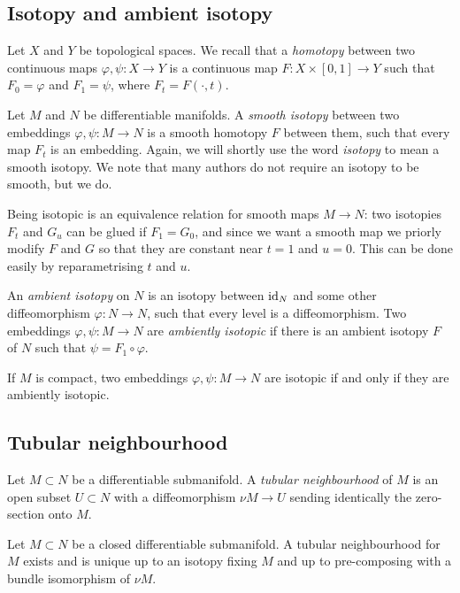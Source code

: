 \subsection{Isotopy and ambient isotopy} \label{isotopy:subsection}
Let $X$ and $Y$ be topological spaces. We recall that a \emph{homotopy} between two continuous maps $\varphi, \psi\colon X \to Y$ is a continuous map $F\colon X\times [0,1]\to Y$  such that $F_0 = \varphi$ and $F_1 = \psi$, where $F_t = F(\cdot, t)$. 

Let $M$ and $N$ be differentiable manifolds. A \emph{smooth isotopy} between two embeddings $\varphi, \psi\colon M \to N$ is a smooth homotopy $F$ between them, such that every map $F_t$ is an embedding. Again, we will shortly use the word \emph{isotopy} to mean a smooth isotopy. We note that many authors do not require an isotopy to be smooth, but we do.

Being isotopic is an equivalence relation for smooth maps $M\to N$: two isotopies $F_t$ and $G_u$ can be glued if $F_1 = G_0$, and since we want a smooth map we priorly modify $F$ and $G$ so that they are constant near $t=1$ and $u=0$. This can be done easily by reparametrising $t$ and $u$.

An \emph{ambient isotopy} on $N$ is an isotopy between ${\rm id}_N$ and some other diffeomorphism $\varphi\colon N \to N$, such that every level is a diffeomorphism. Two embeddings $\varphi, \psi\colon M \to N$
are \emph{ambiently isotopic} if there is an ambient isotopy $F$ of $N$ such that $\psi = F_1\circ \varphi$. 

\begin{teo} 
If $M$ is compact, two embeddings $\varphi, \psi\colon M \to N$ are isotopic if and only if they are ambiently isotopic.
\end{teo}

\subsection{Tubular neighbourhood}
Let $M\subset N$ be a differentiable submanifold. A \emph{tubular neighbourhood} of $M$ is an open subset $U\subset N$ with a diffeomorphism $\nu M \to U$ sending identically the zero-section onto $M$. 

\begin{teo} Let $M\subset N$ be a closed differentiable submanifold. A tubular neighbourhood for $M$ exists and is unique up to an isotopy fixing $M$ and up to pre-composing with a bundle isomorphism of $\nu M$.
\end{teo}

